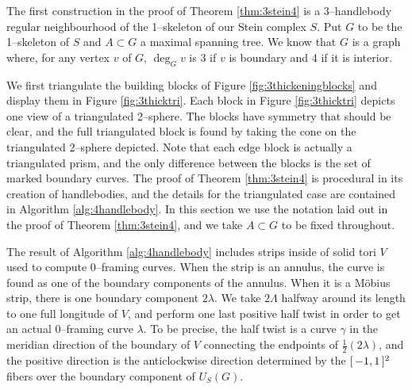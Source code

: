The first construction in the proof of Theorem \ref{thm:3stein4} is a 3--handlebody regular neighbourhood of the 1--skeleton of our Stein complex $S$.
Put $G$ to be the 1--skeleton of $S$ and $A\subset G$ a maximal spanning tree.
We know that $G$ is a graph where, for any vertex $v$ of $G$, $\deg_G v$ is 3 if $v$ is boundary and 4 if it is interior.

We first triangulate the building blocks of Figure \ref{fig:3thickeningblocks} and display them in Figure \ref{fig:3thicktri}.
Each block in Figure \ref{fig:3thicktri} depicts one view of a triangulated 2--sphere.
The blocks have symmetry that should be clear, and the full triangulated block is found by taking the cone on the triangulated 2--sphere depicted.
Note that each edge block is actually a triangulated prism, and the only difference between the blocks is the set of marked boundary curves.
The proof of Theorem \ref{thm:3stein4} is procedural in its creation of handlebodies, and the details for the triangulated case are contained in Algorithm \ref{alg:4handlebody}.
In this section we use the notation laid out in the proof of Theorem \ref{thm:3stein4}, and we take $A\subset G$ to be fixed throughout.

The result of Algorithm \ref{alg:4handlebody} includes strips inside of solid tori $V$ used to compute 0--framing curves.
When the strip is an annulus, the curve is found as one of the boundary components of the annulus.
When it is a M\"obius strip, there is one boundary component $2\lambda$.
We take $2\Lambda$ halfway around its length to one full longitude of $V$, and perform one last positive half twist in order to get an actual 0--framing curve $\lambda$.
To be precise, the half twist is a curve $\gamma$ in the meridian direction of the boundary of $V$ connecting the endpoints of $\frac{1}{2}(2\lambda)$, and the positive direction is the anticlockwise direction determined by the $[\,-1,1\,]^2$ fibers over the boundary component of $U_S(G)$.

